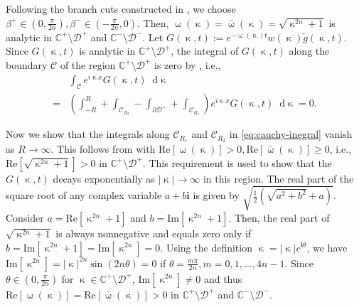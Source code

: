 \documentclass[journal,twoside,web]{ieeecolor}
\newcommand{\CC}{\mathbb{C}}
\newcommand{\D}{\mathcal{D}}
\newcommand{\C}{\mathcal{C}}
\newcommand{\im}{\mathbf{i}}
\newcommand*\diff{\mathop{}\!\mathrm{d}}
\newcommand{\wcomplex}{\upomega}
\newcommand{\kcomplex}{\upkappa}
\begin{document}
Following the branch cuts constructed in , we choose $\beta^+\in(0,\frac{\pi}{2n}),\beta^-\in(-\frac{\pi}{2n},0)$.
Then, $\wcomplex(\kcomplex)=\bar{\wcomplex}(\kcomplex)=\sqrt{\kcomplex^{2n}+1}$ is analytic in $\CC^+\setminus\D^+$ and $\CC^-\setminus\D^-$.
Let $G(\kcomplex,t):=e^{-\wcomplex(\kcomplex)t}w(\kcomplex)\tilde{g}(\kcomplex,t)$.
Since $G(\kcomplex,t)$ is analytic in $\CC^+\setminus\D^+$, the integral of $G(\kcomplex,t)$ along the boundary $\C$ of the region $\CC^+\setminus\D^+$ is zero by , i.e.,
\begin{equation}\label{eq:cauchy-inegral}
		\begin{aligned}
				&\int_{\C}e^{i\kcomplex x}G(\kcomplex,t) \diff \kcomplex \\= &\left(\int_{-R}^{R} + \int_{\C_{R_2}} - \int_{\partial\D^+} + \int_{\C_{R_1}}\right)e^{i\kcomplex x}G(\kcomplex,t) \diff \kcomplex = 0.
		\end{aligned}
\end{equation}

Now we show that the integrals along $\C_{R_1}$ and $\C_{R_2}$ in \eqref{eq:cauchy-inegral} vanish as $R\to\infty$.
This follows from  with  $\text{Re}[\wcomplex(\kcomplex)]>0,\text{Re}[\bar{\wcomplex}(\kcomplex)]\geq0$, i.e., $\text{Re}[\sqrt{\kcomplex^{2n}+1}]>0$ in $\CC^+\setminus\D^+$.
This requirement is used to show that the 
$G(\kcomplex,t)$ decays exponentially as $|\kcomplex|\to\infty$ in this region.
The real part of the square root of any complex variable $a+b\im$ is given by $\sqrt{\frac{1}{2}(\sqrt{a^2+b^2}+a)}$. 
Consider $a=\text{Re}[\kcomplex^{2n}+1]$ and $b=\text{Im}[\kcomplex^{2n}+1]$. Then, the real part of $\sqrt{\kcomplex^{2n}+1}$ is always nonnegative and equals zero only if $b=\text{Im}[\kcomplex^{2n}+1]=\text{Im}[\kcomplex^{2n}]=0$. 
Using the definition $\kcomplex=|\kcomplex|e^{\im\theta}$, we have $\text{Im}[\kcomplex^{2n}]=|\kcomplex|^{2n}\sin(2n\theta)=0$ if $\theta=\frac{m\pi}{2n}, m=0,1,\ldots,4n-1$. Since $\theta\in(0,\frac{\pi}{2n})$ for $\kcomplex\in\CC^+\setminus\D^+$, $\text{Im}[\kcomplex^{2n}]\neq0$ and thus $\text{Re}[\wcomplex(\kcomplex)]=\text{Re}[\bar{\wcomplex}(\kcomplex)]>0$ in $\CC^+\setminus\D^+$ and $\CC^-\setminus\D^-$.
\end{document}

